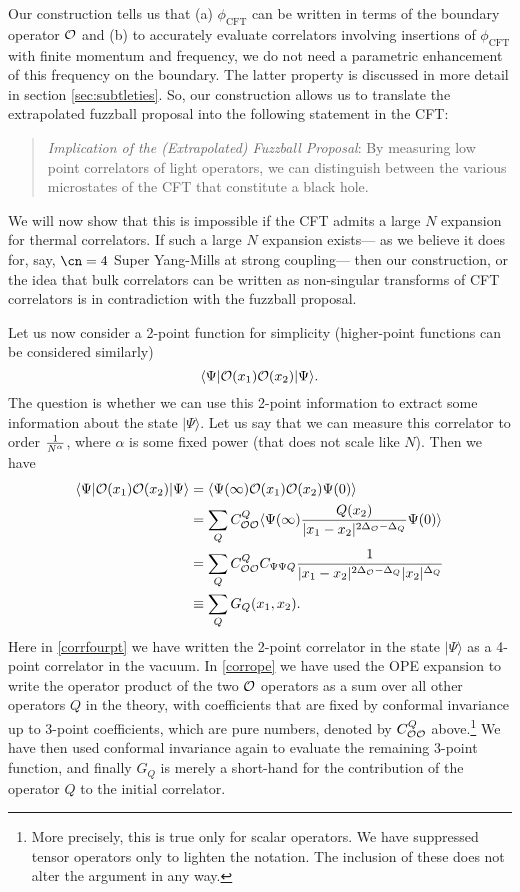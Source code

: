 Our construction tells us that (a)  $\phi_{\text{CFT}}$ can be written in terms of the boundary operator ${\cal O}$ and (b) to accurately evaluate
correlators involving insertions of $\phi_{\text{CFT}}$ with finite momentum and frequency, we do not need a parametric enhancement of this frequency 
on the boundary. The latter property is discussed in more detail in section \ref{sec:subtleties}.  So, our construction allows us to translate the extrapolated fuzzball proposal into the  following statement in the CFT:
\begin{quote}
{\it Implication of the (Extrapolated) Fuzzball Proposal}: By measuring low point correlators of light operators, we can distinguish between the various microstates of the CFT that constitute a black hole. 
\end{quote}
We will now show that this is impossible if the CFT admits a large $N$ expansion for thermal correlators. If such a large $N$ expansion exists--- as we believe it does for, say, ${\cn = 4}$ Super Yang-Mills at strong coupling--- then our construction, or the idea that bulk correlators can be written as non-singular transforms of CFT correlators is in contradiction with the fuzzball proposal.

Let us now consider a 2-point function for simplicity (higher-point functions can be considered similarly)
\[
\langle \Psi | {\cal O}(x_1) {\cal O}(x_2) | \Psi \rangle.
 \]
 The question is whether we can use this 2-point information to extract some information about the state $|\Psi\rangle$.  
Let us say that we can measure this correlator to order ${1 \over N^{\alpha}}$, where $\alpha$ is some fixed power (that does not scale like $N$). Then we have
\begin{align}
\label{corrfourpt} \langle \Psi | {\cal O}(x_1) {\cal O}(x_2) | \Psi \rangle &= \langle \Psi(\infty) {\cal O}(x_1) {\cal O}(x_2)  
\Psi(0) \rangle \\ \label{corrope} &= \sum_Q C_{{\cal O }{\cal O}}^Q \langle \Psi(\infty) {Q(x_2) \over |x_1 - x_2|^{2 \Delta_{\cal O} - \Delta_Q}} \Psi(0) \rangle \\ \label{corrthreept1}
&= \sum_Q C_{{\cal O}{\cal O}}^Q C_{\Psi \Psi Q}  {1 \over |x_1 - x_2|^{2 \Delta_{\cal O} - \Delta_Q} |x_2|^{\Delta_Q}} \\ \label{corrsumq}
&\equiv \sum_Q G_Q(x_1, x_2).
\end{align}
Here in \eqref{corrfourpt} we have written the 2-point correlator in the state $|\Psi\rangle$ as a 4-point correlator in the vacuum. In \eqref{corrope} we have used the OPE expansion to write the operator product of the two ${\cal O}$ operators as a sum over all other operators $Q$ in the theory, with coefficients that are fixed by conformal invariance up to 3-point coefficients, which are pure numbers, denoted by $C_{{\cal O}{\cal O}}^Q$ above.\footnote{More precisely, this is true only for scalar operators. We have suppressed tensor operators only to lighten the notation. The inclusion of these does not alter the argument in any way.} We have then used conformal invariance again to evaluate the remaining 3-point function, and finally $G_Q$ is merely a short-hand for the contribution of the operator $Q$ to the initial correlator.

